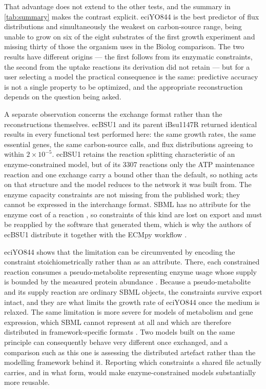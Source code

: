 \documentclass[11pt, a4paper]{article}
\begin{document}
That advantage does not extend to the other tests, and the summary in \autoref{tab:summary} makes the contrast explicit. eciYO844 is the best predictor of flux distributions and simultaneously the weakest on carbon-source range, being unable to grow on six of the eight substrates of the first growth experiment and missing thirty of those the organism uses in the Biolog comparison. The two results have different origins --- the first follows from its enzymatic constraints, the second from the uptake reactions its derivation did not retain --- but for a user selecting a model the practical consequence is the same: predictive accuracy is not a single property to be optimized, and the appropriate reconstruction depends on the question being asked.

A separate observation concerns the exchange format rather than the reconstructions themselves. ecBSU1 and its parent iBsu1147R returned identical results in every functional test performed here: the same growth rates, the same essential genes, the same carbon-source calls, and flux distributions agreeing to within $2\times10^{-5}$. ecBSU1 retains the reaction splitting characteristic of an enzyme-constrained model, but of its 3307 reactions only the ATP maintenance reaction and one exchange carry a bound other than the default, so nothing acts on that structure and the model reduces to the network it was built from. The enzyme capacity constraints are not missing from the published work; they cannot be expressed in the interchange format. SBML has no attribute for the enzyme cost of a reaction \parencite{olivier-2018}, so constraints of this kind are lost on export and must be reapplied by the software that generated them, which is why the authors of ecBSU1 distribute it together with the ECMpy workflow \parencite{wu-2023}.

eciYO844 shows that the limitation can be circumvented by encoding the constraint stoichiometrically rather than as an attribute. There, each constrained reaction consumes a pseudo-metabolite representing enzyme usage whose supply is bounded by the measured protein abundance \parencite{massaiu-2019}. Because a pseudo-metabolite and its supply reaction are ordinary SBML objects, the constraints survive export intact, and they are what limits the growth rate of eciYO844 once the medium is relaxed. The same limitation is more severe for models of metabolism and gene expression, which SBML cannot represent at all and which are therefore distributed in framework-specific formats \parencite{lloyd-2018}. Two models built on the same principle can consequently behave very different once exchanged, and a comparison such as this one is assessing the distributed artefact rather than the modelling framework behind it. Reporting which constraints a shared file actually carries, and in what form, would make enzyme-constrained models substantially more reusable.
\end{document}
